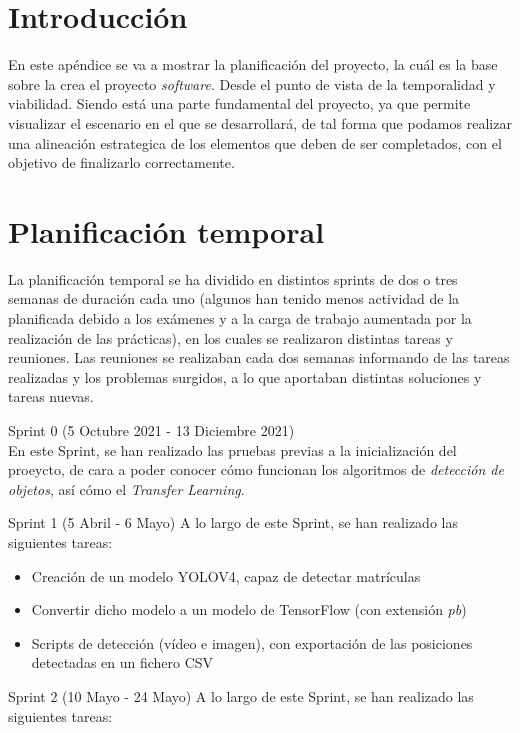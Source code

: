
\section{Introducción}
En este apéndice se va a mostrar la planificación del proyecto, la cuál es la base sobre la crea el proyecto \textit{software}. Desde el punto de vista de la temporalidad y viabilidad. 
Siendo está una parte fundamental del proyecto, ya que permite visualizar el escenario en el que se desarrollará, de tal forma que podamos realizar una alineación estrategica de los elementos que deben de ser completados, con el objetivo de finalizarlo correctamente.

\section{Planificación temporal}
La planificación temporal se ha dividido en distintos sprints de dos o tres semanas de duración cada uno (algunos han tenido menos actividad de la planificada debido a los exámenes y a la carga de trabajo aumentada por la realización de las prácticas), en los cuales se realizaron distintas tareas y reuniones. Las reuniones se realizaban cada dos semanas informando de
las tareas realizadas y los problemas surgidos, a lo que aportaban distintas soluciones y tareas nuevas.

Sprint 0 (5 Octubre 2021 - 13 Diciembre 2021)\\
En este Sprint, se han realizado las pruebas previas a la inicialización del proeycto, de cara a poder conocer cómo funcionan los algoritmos de \textit{detección de objetos}, así cómo el \textit{Transfer Learning}.

\clearpage

Sprint 1 (5 Abril - 6 Mayo)
A lo largo de este Sprint, se han realizado las siguientes tareas:

\begin{itemize}
    \item Creación de un modelo YOLOV4, capaz de detectar matrículas
    \item Convertir dicho modelo a un modelo de TensorFlow (con extensión \textit{pb})
    \item Scripts de detección (vídeo e imagen), con exportación de las posiciones detectadas en un fichero CSV
\end{itemize}

Sprint 2 (10 Mayo - 24 Mayo)
A lo largo de este Sprint, se han realizado las siguientes tareas:


